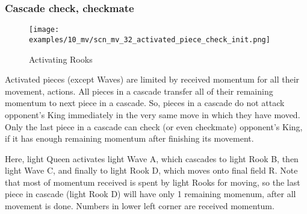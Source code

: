 

\clearpage %

\subsubsection*{Cascade check, checkmate}

\vspace*{-1.4\baselineskip}
\noindent
\begin{figure}[!h]
\texttt{[image: examples/10\_mv/scn\_mv\_32\_activated\_piece\_check\_init.png]}
\vspace*{-1.3\baselineskip}
\caption{Activating Rooks}
\label{fig:scn_mv_32_activated_piece_check_init}
\end{figure}

\vspace*{-0.3\baselineskip}
Activated pieces (except Waves) are limited by received momentum for all their movement,
actions. All pieces in a cascade transfer all of their remaining momentum to next piece
in a cascade. So, pieces in a cascade do not attack opponent's King immediately in the
very same move in which they have moved. Only the last piece in a cascade can check (or
even checkmate) opponent's King, if it has enough remaining momentum after finishing its
movement.

Here, light Queen activates light Wave A, which cascades to light Rook B, then light
Wave C, and finally to light Rook D, which moves onto final field R. Note that most
of momentum received is spent by light Rooks for moving, so the last piece in cascade
(light Rook D) will have only 1 remaining momenum, after all movement is done. Numbers
in lower left corner are received momentum.

\clearpage %

